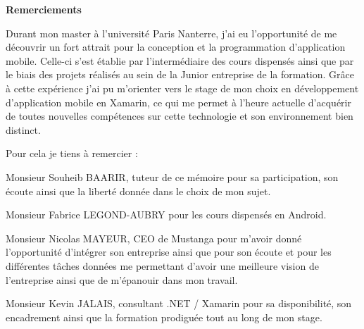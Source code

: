 \documentclass[11]{article}
\begin{document}
\newpage
\thispagestyle{empty}
\strut 

\newpage

\setcounter{page}{1}

\begin{center}
\textbf{\huge Remerciements}
\end{center}

\vspace{1.5cm}

\hspace{0.5cm} 

Durant mon master à l’université Paris Nanterre, j’ai eu l’opportunité de me découvrir un fort attrait pour la conception et la programmation d’application mobile. Celle-ci s'est établie par l’intermédiaire des cours dispensés ainsi que par le biais des projets réalisés au sein de la Junior entreprise de la formation. Grâce à cette expérience j’ai pu m’orienter vers le stage de mon choix en développement d’application mobile en Xamarin, ce qui me permet à l’heure actuelle d’acquérir de toutes nouvelles compétences sur cette technologie et son environnement bien distinct.

\vspace{0.5cm}

Pour cela je tiens à remercier : 

\vspace{0.5cm}

Monsieur Souheib BAARIR, tuteur de ce mémoire pour sa participation, son écoute ainsi que la liberté donnée dans le choix de mon sujet.

\vspace{0.5cm}

Monsieur Fabrice LEGOND-AUBRY pour les cours dispensés en Android.

\vspace{0.5cm}

Monsieur Nicolas MAYEUR, CEO de Mustanga pour m’avoir donné l’opportunité d’intégrer son entreprise ainsi que pour son écoute et pour les différentes tâches données me permettant d’avoir une meilleure vision de l’entreprise ainsi que de m’épanouir dans mon travail.

\vspace{0.5cm}

Monsieur Kevin JALAIS, consultant .NET / Xamarin pour sa disponibilité, son encadrement ainsi que la formation prodiguée tout au long de mon stage.

\newpage
\thispagestyle{empty}
\strut

\newpage
\setcounter{page}{2}
\tableofcontents
\end{document}
